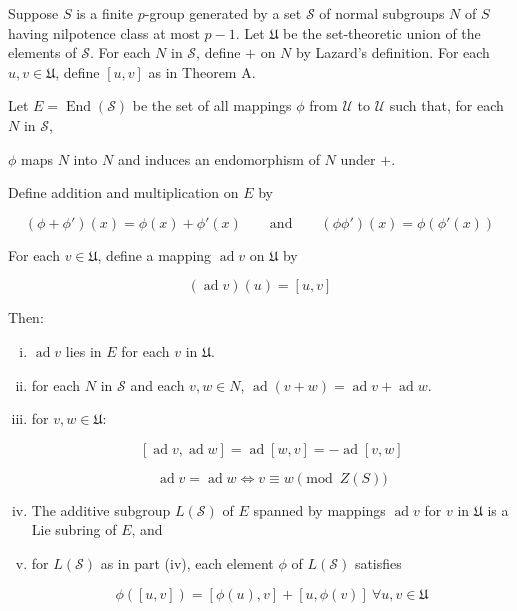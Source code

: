\begin{theorem}
  Suppose $S$ is a finite $p$-group generated by a set $\mathcal{S}$
  of normal subgroups $N$ of $S$ having nilpotence class at most $p -
  1$. Let $\mathfrak{U}$ be the set-theoretic union of the elements of
  $\mathcal{S}$. For each $N$ in $\mathcal{S}$, define $+$ on $N$ by
  Lazard's definition. For each $u,v \in \mathfrak{U}$, define $[u,v]$
  as in Theorem A.

  Let $E = \operatorname{End}(\mathcal{S})$ be the set of all mappings
  $\phi$ from $\mathcal{U}$ to $\mathcal{U}$ such that, for each $N$
  in $\mathcal{S}$,

  $\phi$ maps $N$ into $N$ and induces an endomorphism of $N$ under
  $+$.

  Define addition and multiplication on $E$ by

  $$(\phi + \phi')(x) = \phi(x) + \phi'(x) \qquad \text{and} \qquad (\phi \phi')(x) = \phi(\phi'(x))$$

  For each $v \in \mathfrak{U}$, define a mapping $\operatorname{ad}
  v$ on $\mathfrak{U}$ by

  $$(\operatorname{ad} v)(u) = [u,v]$$

  Then:

  \begin{enumerate}[(i)]
  \item $\operatorname{ad} v$ lies in $E$ for each $v$ in
    $\mathfrak{U}$.
  \item for each $N$ in $\mathcal{S}$ and each $v,w \in N$,
    $\operatorname{ad}(v + w) = \operatorname{ad} v +
    \operatorname{ad} w$.
  \item for $v,w \in \mathfrak{U}$:

    $$[\operatorname{ad} v, \operatorname{ad} w] = \operatorname{ad}[w,v] = -\operatorname{ad}[v,w]$$
    
    $$\operatorname{ad} v = \operatorname{ad} w \iff v \equiv w \pmod{Z(S)}$$
  \item The additive subgroup $L(\mathcal{S})$ of $E$ spanned by
    mappings $\operatorname{ad} v$ for $v$ in $\mathfrak{U}$ is a Lie
    subring of $E$, and
  \item for $L(\mathcal{S})$ as in part (iv), each element $\phi$ of
    $L(\mathcal{S})$ satisfies

    $$\phi([u,v]) = [\phi(u),v] + [u,\phi(v)] \ \forall u,v \in \mathfrak{U}$$
  \end{enumerate}
\end{theorem}

